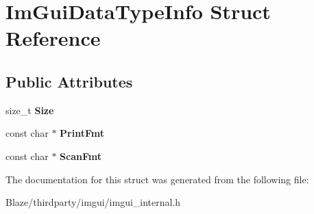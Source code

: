 \hypertarget{structImGuiDataTypeInfo}{}\section{Im\+Gui\+Data\+Type\+Info Struct Reference}
\label{structImGuiDataTypeInfo}
\subsection*{Public Attributes}
\begin{DoxyCompactItemize}
\item 
\mbox{\label{structImGuiDataTypeInfo_a49a2b2d99b93b7db968a74d92380ecbf}} 
size\+\_\+t {\bfseries Size}
\item 
\mbox{\label{structImGuiDataTypeInfo_aa66ad5a40cbfe164121fcd0f35abd438}} 
const char $\ast$ {\bfseries Print\+Fmt}
\item 
\mbox{\label{structImGuiDataTypeInfo_aaa2d211e7cc5f03786f82650b69e9cf3}} 
const char $\ast$ {\bfseries Scan\+Fmt}
\end{DoxyCompactItemize}


The documentation for this struct was generated from the following file\+:\begin{DoxyCompactItemize}
\item 
Blaze/thirdparty/imgui/imgui\+\_\+internal.\+h\end{DoxyCompactItemize}

